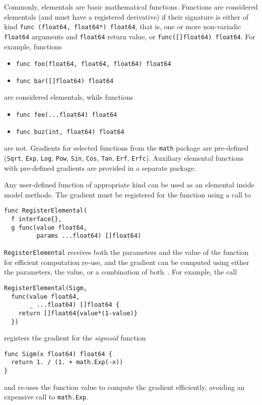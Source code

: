 \documentclass[sigplan,10pt,screen]{acmart}
\begin{document}
\begin{sloppypar}
Commonly, elementals are basic mathematical functions.
Functions are considered elementals (and must have a
registered derivative) if their signature is either of kind
\lstinline{func (float64, float64*) float64}, that is,
one or more non-variadic \lstinline{float64} arguments and
\lstinline{float64} return value, or \lstinline{func([]float64) float64}.
For example, functions
\begin{itemize}
  \item \lstinline{func foo(float64, float64, float64) float64}
  \item \lstinline{func bar([]float64) float64}
\end{itemize}
are considered elementals, while functions
\begin{itemize}
  \item \lstinline{func fee(...float64) float64}
  \item \lstinline{func buz(int, float64) float64}
\end{itemize}
are not. Gradients for selected functions from the
\lstinline{math} package are pre-defined (\lstinline{Sqrt},
\lstinline{Exp}, \lstinline{Log}, \lstinline{Pow},
\lstinline{Sin}, \lstinline{Cos}, \lstinline{Tan},
\lstinline{Erf}, \lstinline{Erfc}). Auxiliary elemental
functions with pre-defined gradients are provided in a separate
package.

Any user-defined function of appropriate kind can be used as an
elemental inside model methods. The gradient must be registered
for the function using a call to
\begin{lstlisting}
func RegisterElemental(
  f interface{},
  g func(value float64,
         params ...float64) []float64)
\end{lstlisting}
\lstinline{RegisterElemental} receives both the parameters and
the value of the function for efficient computation re-use, and
the gradient can be computed using either the parameters, the
value, or a combination of both~\cite{GW08}. For example, the
call
\begin{lstlisting}
RegisterElemental(Sigm,
  func(value float64,
       _ ...float64) []float64 {
    return []float64{value*(1-value)}
  })
\end{lstlisting}
registers the gradient for the \textit{sigmoid} function
\begin{lstlisting}
func Sigm(x float64) float64 {
  return 1. / (1. + math.Exp(-x))
}
\end{lstlisting}
and re-uses the function value to compute the gradient
efficiently, avoiding an expensive call to \lstinline{math.Exp}.


\end{sloppypar}
\end{document}
